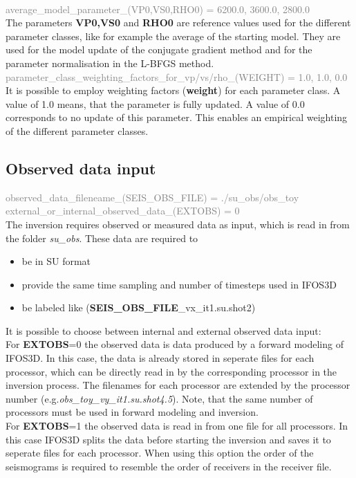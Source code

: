 \vspace{0.3cm}\\
\textcolor {Gray}{average\_model\_parameter\_(VP0,VS0,RHO0) = 6200.0, 3600.0, 2800.0}\vspace{0.1cm}\\
The parameters \textbf{VP0,VS0} and \textbf{RHO0} are reference values used for the different parameter classes, like for example the average of the starting model. They are used for the model update of the conjugate gradient method and for the parameter normalisation in the L-BFGS method.
\vspace{0.3cm}\\
\textcolor {Gray}{parameter\_class\_weighting\_factors\_for\_vp/vs/rho\_(WEIGHT) = 1.0, 1.0, 0.0}\vspace{0.1cm}\\
It is possible to employ weighting factors (\textbf{weight}) for each parameter class. A value of 1.0 means, that the parameter is fully updated. A value of 0.0 corresponds to no update of this parameter. This enables an empirical weighting of the different parameter classes.
\subsection{Observed data input}
\textcolor {Gray}{observed\_data\_fileneame\_(SEIS\_OBS\_FILE) = ./su\_obs/obs\_toy\\
external\_or\_internal\_observed\_data\_(EXTOBS) = 0}\vspace{0.1cm}\\
The inversion requires observed or measured data as input, which is read in from the folder \textit{su\_obs}. These data are required to
\begin{itemize}
 \item be in SU format
 \item provide the same time sampling and number of timesteps used in IFOS3D
 \item be labeled like  (\textbf{SEIS\_OBS\_FILE}\_vx\_it1.su.shot2)
\end{itemize}
It is possible to choose between internal and external observed data input:\\
For \textbf{EXTOBS}=0 the observed data is data produced by a forward modeling of IFOS3D. In this case, the data is already stored in seperate files for each processor, which can be directly read in by the corresponding processor in the inversion process. The filenames for each processor are extended by the processor number (e.g.\textit{obs\_toy\_vy\_it1.su.shot4.5}). Note, that the same number of processors must be used in forward modeling and inversion. \\
For \textbf{EXTOBS}=1 the observed data is read in from one file for all processors. In this case IFOS3D splits the data before starting the inversion and saves it to seperate files for each processor. When using this option the order of the seismograms is required to resemble the order of receivers in the receiver file.
